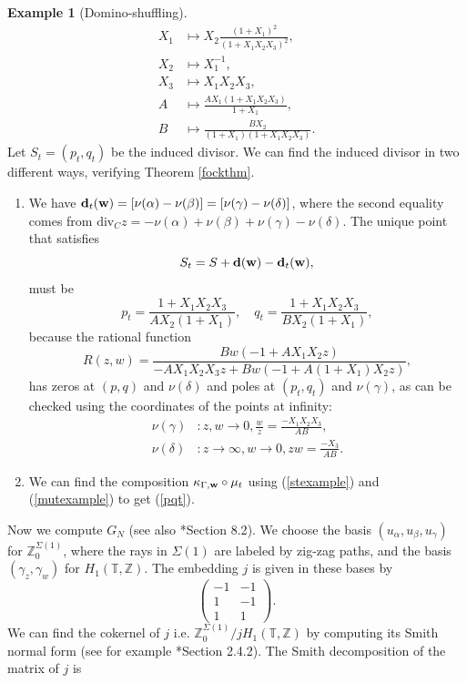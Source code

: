 \documentclass[11pt]{article} %
\theoremstyle{definition}
\newtheorem{example}[theorem]{Example}
\newcommand{\Z}{{\mathbb Z}}
\newcommand{\T}{{\mathbb T}}
\newcommand{\ra}{\rightarrow}
\newcommand{\be}{\begin{equation}}
\newcommand{\ee}{\end{equation}}
\newcommand{\la}{\label}
\begin{document}
\begin{example}[Domino-shuffling]
 \begin{align}
     X_1 &\mapsto X_2 \frac{(1+X_1)^2}{(1+X_1 X_2 X_3)^2},\nonumber\\
     X_2 &\mapsto X_1^{-1},\nonumber\\
     X_3 &\mapsto X_1 X_2 X_3,\nonumber\\
     A &\mapsto \frac{AX_1(1+X_1X_2X_3)}{1+X_1}, \nonumber\\
     B &\mapsto \frac{B X_2}{(1+X_1)(1+X_1 X_2 X_3)}.\la{mutexample}
 \end{align}
 Let $S_t=(p_t,q_t)$ be the induced divisor. We can find the induced divisor in two different ways, verifying Theorem \ref{fockthm}.
 \begin{enumerate}
     \item We have ${\bf d}_t({\bf w})=[\nu(\alpha)-\nu(\beta)]=[\nu(\gamma)-\nu(\delta)]$, where the second equality comes from $\text{div}_C{z}=-\nu(\alpha)+\nu(\beta)+\nu(\gamma)-\nu(\delta)$. The unique point that satisfies
     $$
     S_t = S+{\bf d}({\bf w})-{\bf d}_t({\bf w}),
$$
      must be
 \be \la{pqt}
 p_t=\frac{1+X_1 X_2 X_3}{A X_2 (1+ X_1) },\quad q_t=\frac{1+X_1 X_2 X_3}{B
X_2 (1+ X_1) },
 \ee
because the rational function 
$$
R(z,w)=\frac{B w(-1+A X_1 X_2 z)}{-A X_1 X_2 X_3 z+B w(-1+A(1+X_1)X_2 z)},
$$
has zeros at $(p,q)$ and $\nu(\delta)$ and poles at $(p_t,q_t)$ and $\nu(\gamma)$, as can be checked using the coordinates of the points at infinity:
\begin{align*}
\nu(\gamma)&: z,w\ra 0, \frac{w}{z}=\frac{-X_1 X_2 X_3}{AB},\\
\nu(\delta)&: z \ra \infty, w \ra 0, z w = \frac{-X_3}{AB}.
\end{align*}
\item We can find the composition $\kappa_{\Gamma, {\bf w}} \circ \mu_t$ using (\ref{stexample}) and (\ref{mutexample}) to get (\ref{pqt}). 
 \end{enumerate}
Now we compute $G_N$ (see also \cite{FM16}*{Section 8.2}). We choose the basis $(u_\alpha,u_\beta,u_\gamma)$ for $\Z^{\Sigma(1)}_0$, where the rays in $\Sigma(1)$ are labeled by zig-zag paths, and the basis $(\gamma_z,\gamma_w)$ for $H_1(\T,\Z)$. The embedding $j$ is given in these bases by
\[
\begin{pmatrix}
-1&-1\\
1&-1\\
1&1
\end{pmatrix}.
\]
We can find the cokernel of $j$ i.e. $\Z^{\Sigma(1)}_0/jH_1(\T,\Z)$ by computing its Smith normal form (see for example \cite{sand}*{Section 2.4.2}). The Smith decomposition of the matrix of $j$ is

\end{example}
\end{document}
